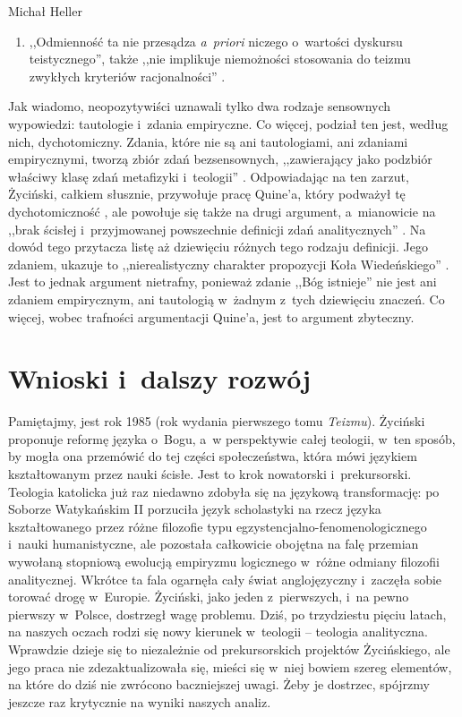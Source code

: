 \begin{artplenv}{Michał Heller}
\begin{enumerate}
\item ,,Odmienność ta nie przesądza \textit{a~priori} niczego o~wartości dyskursu teistycznego'', także ,,nie implikuje niemożności stosowania do teizmu zwykłych kryteriów racjonalności''
\parencite[][s.~32]{zycinski_teizm_1985}.%

\end{enumerate}
Jak wiadomo, neopozytywiści uznawali tylko dwa rodzaje sensownych wypowiedzi: tautologie i~zdania empiryczne. Co więcej, podział ten jest, według nich, dychotomiczny. Zdania, które nie są ani tautologiami, ani zdaniami empirycznymi, tworzą zbiór zdań bezsensownych, ,,zawierający jako podzbiór właściwy klasę zdań metafizyki i~teologii''
\parencite[][s.~34]{zycinski_teizm_1985}. %
 Odpowiadając na ten zarzut, Życiński, całkiem słusznie, przywołuje pracę Quine'a, który podważył tę dychotomiczność 
\parencite[][]{quine_dwa_1969}, %
 ale powołuje się także na drugi argument, a~mianowicie na ,,brak ścisłej i~przyjmowanej powszechnie definicji zdań analitycznych'' 
\parencite[][s.~34]{zycinski_teizm_1985}. %
 Na dowód tego przytacza listę aż dziewięciu różnych tego rodzaju definicji. Jego zdaniem, ukazuje to ,,nierealistyczny charakter propozycji Koła Wiedeńskiego'' 
\parencite[][s.~34]{zycinski_teizm_1985}. %
 Jest to jednak argument nietrafny, ponieważ zdanie ,,Bóg istnieje'' nie jest ani zdaniem empirycznym, ani tautologią w~żadnym z~tych dziewięciu znaczeń. Co więcej, wobec trafności argumentacji Quine'a, jest to argument zbyteczny.

\section{Wnioski i~dalszy rozwój}
Pamiętajmy, jest rok 1985 (rok wydania pierwszego tomu \textit{Teizmu}). Życiński proponuje reformę języka o~Bogu, a~w perspektywie całej teologii, w~ten sposób, by mogła ona przemówić do tej części społeczeństwa, która mówi językiem kształtowanym przez nauki ścisłe. Jest to krok nowatorski i~prekursorski. Teologia katolicka już raz niedawno zdobyła się na językową transformację: po Soborze Watykańskim II porzuciła język scholastyki na rzecz języka kształtowanego przez różne filozofie typu egzystencjalno-fenomenologicznego i~nauki humanistyczne, ale pozostała całkowicie obojętna na falę przemian wywołaną stopniową ewolucją empiryzmu logicznego w~różne odmiany filozofii analitycznej. Wkrótce ta fala ogarnęła cały świat anglojęzyczny i~zaczęła sobie torować drogę w~Europie. Życiński, jako jeden z~pierwszych, i~na pewno pierwszy w~Polsce, dostrzegł wagę problemu. Dziś, po trzydziestu pięciu latach, na naszych oczach rodzi się nowy kierunek w~teologii -- teologia analityczna. Wprawdzie dzieje się to niezależnie od prekursorskich projektów Życińskiego, ale jego praca nie zdezaktualizowała się, mieści się w~niej bowiem szereg elementów, na które do dziś nie zwrócono baczniejszej uwagi. Żeby je dostrzec, spójrzmy jeszcze raz krytycznie na wyniki naszych analiz.


\end{artplenv}
